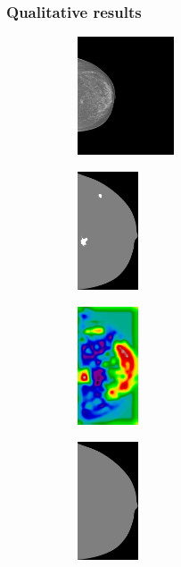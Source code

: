 \documentclass{beamer}
\begin{document}
	\begin{frame}
		\frametitle{Qualitative results}
		\begin{figure}[h]
		\centering
			\begin{subfigure}{0.25\textwidth}
				\centering
					\includegraphics[height=3.5cm]{plots/mammogram_ex1.png}
			\end{subfigure}
			\begin{subfigure}{0.16\textwidth}
				\centering
					\includegraphics[height=3.5cm]{plots/label_ex1.png}
			\end{subfigure}
			\begin{subfigure}{0.16\textwidth}
				\centering
					\includegraphics[height=3.5cm]{plots/logits_ex1_v2.png}
			\end{subfigure}
			\begin{subfigure}{0.22\textwidth}
				\centering
					\includegraphics[height=3.5cm]{plots/segmentation_ex1_v2.png}
			\end{subfigure}%
			\\
			\begin{subfigure}{0.25\textwidth}

\end{subfigure}
\end{figure}
\end{frame}
\end{document}
